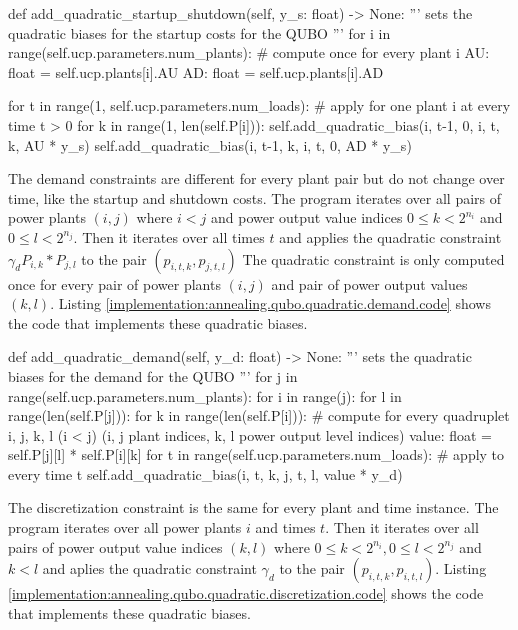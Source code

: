 \begin{python}[
  float,
  caption={Implementation of the Quadratic Startup and Shutdown Biases for QUBOs},
  label={implementation:annealing.qubo.quadratic.startup.code}
]
def add_quadratic_startup_shutdown(self, y_s: float) -> None:
  '''
  sets the quadratic biases for the startup costs for the QUBO
  '''
  for i in range(self.ucp.parameters.num_plants):
    # compute once for every plant i
    AU: float = self.ucp.plants[i].AU
    AD: float = self.ucp.plants[i].AD

    for t in range(1, self.ucp.parameters.num_loads):
      # apply for one plant i at every time t > 0
      for k in range(1, len(self.P[i])):
        self.add_quadratic_bias(i, t-1, 0, i, t, k, AU * y_s)
        self.add_quadratic_bias(i, t-1, k, i, t, 0, AD * y_s)
\end{python}

The demand constraints are different for every plant pair but do not change over time, like the startup and shutdown costs.
The program iterates over all pairs of power plants $(i, j)$ where $i < j$ and power output value indices $0 \leq k < 2^{n_i}$ and $0 \leq l < 2^{n_j}$.
Then it iterates over all times $t$ and applies the quadratic constraint $\gamma_d P_{i, k} * P_{j, l}$ to the pair $(p_{i, t, k}, p_{j, t, l})$
The quadratic constraint is only computed once for every pair of power plants $(i, j)$ and pair of power output values $(k, l)$.
Listing \ref{implementation:annealing.qubo.quadratic.demand.code} shows the code that implements these quadratic biases.

\begin{python}[
  float,
  caption={Implementation of the Quadratic Demand Biases for QUBOs},
  label={implementation:annealing.qubo.quadratic.demand.code}
]
def add_quadratic_demand(self, y_d: float) -> None:
  '''
  sets the quadratic biases for the demand for the QUBO
  '''
  for j in range(self.ucp.parameters.num_plants):
    for i in range(j):
      for l in range(len(self.P[j])):
        for k in range(len(self.P[i])):
          # compute for every quadruplet i, j, k, l (i < j) (i, j plant indices, k, l power output level indices)
          value: float = self.P[j][l] * self.P[i][k]
          for t in range(self.ucp.parameters.num_loads):
            # apply to every time t
            self.add_quadratic_bias(i, t, k, j, t, l, value * y_d)
\end{python}

The discretization constraint is the same for every plant and time instance.
The program iterates over all power plants $i$ and times $t$.
Then it iterates over all pairs of power output value indices $(k, l)$ where $0 \leq k < 2^{n_i}, 0 \leq l < 2^{n_j}$ and $k < l$ and aplies the quadratic constraint $\gamma_d$ to the pair $(p_{i, t, k}, p_{i, t, l})$.
Listing \ref{implementation:annealing.qubo.quadratic.discretization.code} shows the code that implements these quadratic biases.

